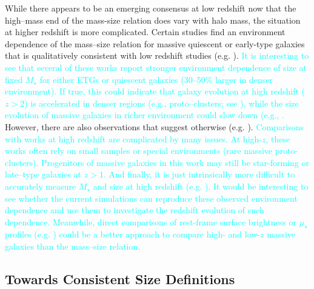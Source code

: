 \documentclass[a4paper,fleqn,usenatbib]{mnras}
\def\mstar{{$M_{\star}$}}
\def\mden{{$\mu_{\star}$}}
\newcommand{\song}[1]{\textcolor{cyan}{#1}}
\begin{document}
    While there appears to be an emerging consensus at low redshift now that the 
    high--mass end of the mass-size relation does vary with halo mass, the situation 
    at higher redshift is more complicated. 
    Certain studies find an environment dependence of the mass--size relation for 
    massive quiescent or early-type galaxies that is qualitatively consistent with low 
    redshift studies (e.g. \citealt{Papovich2012, Bassett2013, Lani2013, 
    Strazzullo2013, Delaye2014}). 
    \song{
    It is interesting to see that several of these works report stronger 
    environment dependence of size at fixed \mstar{} for either ETGs or quiescent 
    galaxies (30--50\% larger in denser environment).
    If true, this could indicate that galaxy evolution at high redshift 
    ($z>2$) is accelerated in denser regions (e.g., proto--clusters; see 
    \citealt{Wang2016, Shimakawa2018}), while the size evolution of massive 
    galaxies in richer environment could slow down (e.g., \citealt{Papovich2012, 
    Andreon2016}.
    }
    However, there are also observations that suggest otherwise (e.g. 
    \citealt{Rettura2010, Raichoor2012, Kelkar2015, Allen2015}). 
    \song{
    Comparisons with works at high redshift are complicated by many issues. 
    At high-$z$, these works often rely on small samples or special environments 
    (rare massive proto-clusters). 
    Progenitors of massive galaxies in this work may still be star-forming or 
    late--type galaxies at $z>1$. 
    And finally, it is just intrinsically more difficult to accurately measure 
    \mstar{} and size at high redshift (e.g. \citealt{Price2017}).
    It would be interesting to see whether the current simulations can reproduce 
    these observed environment dependence and use them to investigate the redshift
    evolution of such dependence. 
    Meanwhile, direct comparisons of rest-frame surface brightness or \mden{} 
    profiles (e.g. \citealt{Szomoru2012, Patel2013, Buitrago2017, Hill2017}) could be 
    a better approach to compare high- and low-$z$ massive galaxies than the 
    mass--size relation.
    }
    
\subsection{Towards Consistent Size Definitions}
        
\end{document}
